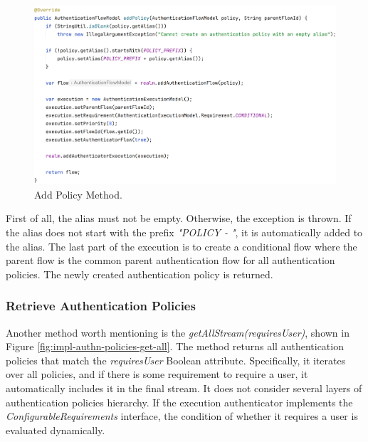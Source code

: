 \begin{figure}[htbp]
  \centering
  \includegraphics[width=1.05\textwidth]{img/sections/6-implementation/authnPolicyAddPolicy.png}
  \caption{Add Policy Method.}
  \label{fig:impl-authn-policies-add-policy-diagram}
\end{figure}

First of all, the alias must not be empty.
Otherwise, the exception is thrown.
If the alias does not start with the prefix \textit{"POLICY - "}, it is automatically added to the alias.
The last part of the execution is to create a conditional flow where the parent flow is the common parent authentication flow for all authentication policies.
The newly created authentication policy is returned.

\newpage

\subsubsection{Retrieve Authentication Policies}

Another method worth mentioning is the \textit{getAllStream(requiresUser)}, shown in Figure \ref{fig:impl-authn-policies-get-all}.
The method returns all authentication policies that match the \textit{requiresUser} Boolean attribute.
Specifically, it iterates over all policies, and if there is some requirement to require a user, it automatically includes it in the final stream.
It does not consider several layers of authentication policies hierarchy.
If the execution authenticator implements the \textit{ConfigurableRequirements} interface, the condition of whether it requires a user is evaluated dynamically.

